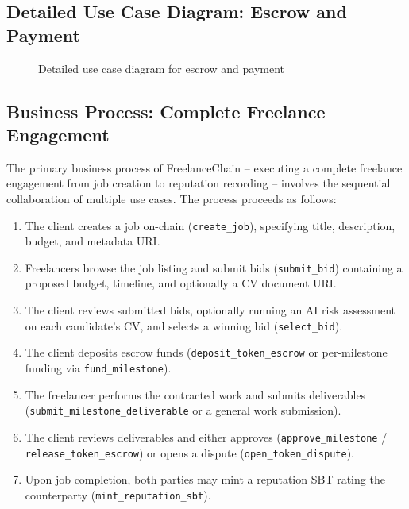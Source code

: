 \subsection{Detailed Use Case Diagram: Escrow and Payment}
\label{subsection:2.2.3_escrow}

\begin{figure}[H]
    \centering
    \caption{Detailed use case diagram for escrow and payment}
    \label{fig:escrow_usecase}
\end{figure}

\subsection{Business Process: Complete Freelance Engagement}
\label{subsection:2.2.4}

The primary business process of FreelanceChain -- executing a complete freelance engagement from job creation to reputation recording -- involves the sequential collaboration of multiple use cases. The process proceeds as follows:

\begin{enumerate}
    \item The client creates a job on-chain (\texttt{create\_job}), specifying title, description, budget, and metadata URI.
    \item Freelancers browse the job listing and submit bids (\texttt{submit\_bid}) containing a proposed budget, timeline, and optionally a CV document URI.
    \item The client reviews submitted bids, optionally running an AI risk assessment on each candidate's CV, and selects a winning bid (\texttt{select\_bid}).
    \item The client deposits escrow funds (\texttt{deposit\_token\_escrow} or per-milestone funding via \texttt{fund\_milestone}).
    \item The freelancer performs the contracted work and submits deliverables (\texttt{submit\_milestone\_deliverable} or a general work submission).
    \item The client reviews deliverables and either approves (\texttt{approve\_milestone} / \texttt{release\_token\_escrow}) or opens a dispute (\texttt{open\_token\_dispute}).
    \item Upon job completion, both parties may mint a reputation SBT rating the counterparty (\texttt{mint\_reputation\_sbt}).
\end{enumerate}

